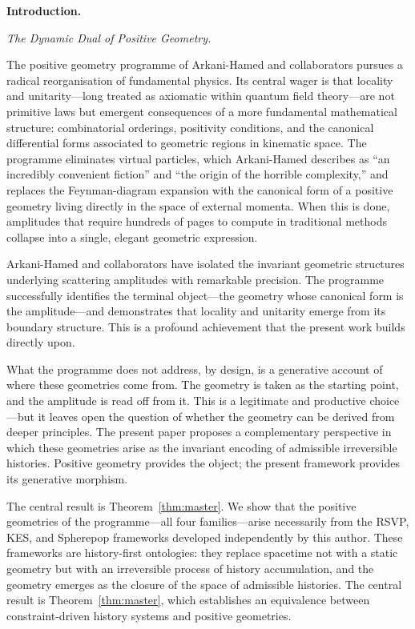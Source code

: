 \documentclass[11pt]{article}
\theoremstyle{plain}
\theoremstyle{definition}
\theoremstyle{remark}
\begin{document}
\newpage
\bigskip\noindent\textbf{Introduction.}
\label{sec:intro}

\medskip\noindent\textit{The Dynamic Dual of Positive Geometry.}

The positive geometry programme of Arkani-Hamed and collaborators pursues a radical reorganisation of fundamental physics. Its central wager is that locality and unitarity---long treated as axiomatic within quantum field theory---are not primitive laws but emergent consequences of a more fundamental mathematical structure: combinatorial orderings, positivity conditions, and the canonical differential forms associated to geometric regions in kinematic space. The programme eliminates virtual particles, which Arkani-Hamed describes as ``an incredibly convenient fiction'' and ``the origin of the horrible complexity,'' and replaces the Feynman-diagram expansion with the canonical form of a positive geometry living directly in the space of external momenta. When this is done, amplitudes that require hundreds of pages to compute in traditional methods collapse into a single, elegant geometric expression.

Arkani-Hamed and collaborators have isolated the invariant geometric structures underlying scattering amplitudes with remarkable precision. The programme successfully identifies the terminal object---the geometry whose canonical form is the amplitude---and demonstrates that locality and unitarity emerge from its boundary structure. This is a profound achievement that the present work builds directly upon.

What the programme does not address, by design, is a generative account of where these geometries come from. The geometry is taken as the starting point, and the amplitude is read off from it. This is a legitimate and productive choice---but it leaves open the question of whether the geometry can be derived from deeper principles. The present paper proposes a complementary perspective in which these geometries arise as the invariant encoding of admissible irreversible histories. Positive geometry provides the object; the present framework provides its generative morphism.

The central result is Theorem~\ref{thm:master}. We show that the positive geometries of the programme---all four families---arise necessarily from the RSVP, KES, and Spherepop frameworks developed independently by this author. These frameworks are history-first ontologies: they replace spacetime not with a static geometry but with an irreversible process of history accumulation, and the geometry emerges as the closure of the space of admissible histories. The central result is Theorem~\ref{thm:master}, which establishes an equivalence between constraint-driven history systems and positive geometries.
\end{document}

